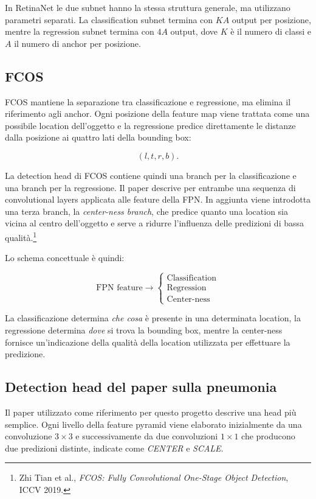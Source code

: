In RetinaNet le due subnet hanno la stessa struttura generale, ma utilizzano
parametri separati. La classification subnet termina con $KA$ output per
posizione, mentre la regression subnet termina con $4A$ output, dove $K$ è il
numero di classi e $A$ il numero di anchor per posizione.

\subsection{FCOS}

FCOS mantiene la separazione tra classificazione e regressione, ma elimina il
riferimento agli anchor. Ogni posizione della feature map viene trattata come
una possibile location dell'oggetto e la regressione predice direttamente le
distanze dalla posizione ai quattro lati della bounding box:

$$
(l,t,r,b).
$$

La detection head di FCOS contiene quindi una branch per la classificazione e
una branch per la regressione. Il paper descrive per entrambe una sequenza di
convolutional layers applicata alle feature della FPN. In aggiunta viene
introdotta una terza branch, la \textit{center-ness branch}, che predice quanto
una location sia vicina al centro dell'oggetto e serve a ridurre l'influenza
delle predizioni di bassa qualità.\footnote{Zhi Tian et al.,
\textit{FCOS: Fully Convolutional One-Stage Object Detection}, ICCV 2019.}

Lo schema concettuale è quindi:

$$
\text{FPN feature}
\rightarrow
\begin{cases}
\text{Classification} \\
\text{Regression} \\
\text{Center-ness}
\end{cases}
$$

La classificazione determina \textit{che cosa} è presente in una determinata
location, la regressione determina \textit{dove} si trova la bounding box,
mentre la center-ness fornisce un'indicazione della qualità della location
utilizzata per effettuare la predizione.

\subsection{Detection head del paper sulla pneumonia}

Il paper utilizzato come riferimento per questo progetto descrive una head più
semplice. Ogni livello della feature pyramid viene elaborato inizialmente da
una convoluzione $3\times3$ e successivamente da due convoluzioni $1\times1$
che producono due predizioni distinte, indicate come \textit{CENTER} e
\textit{SCALE}.

